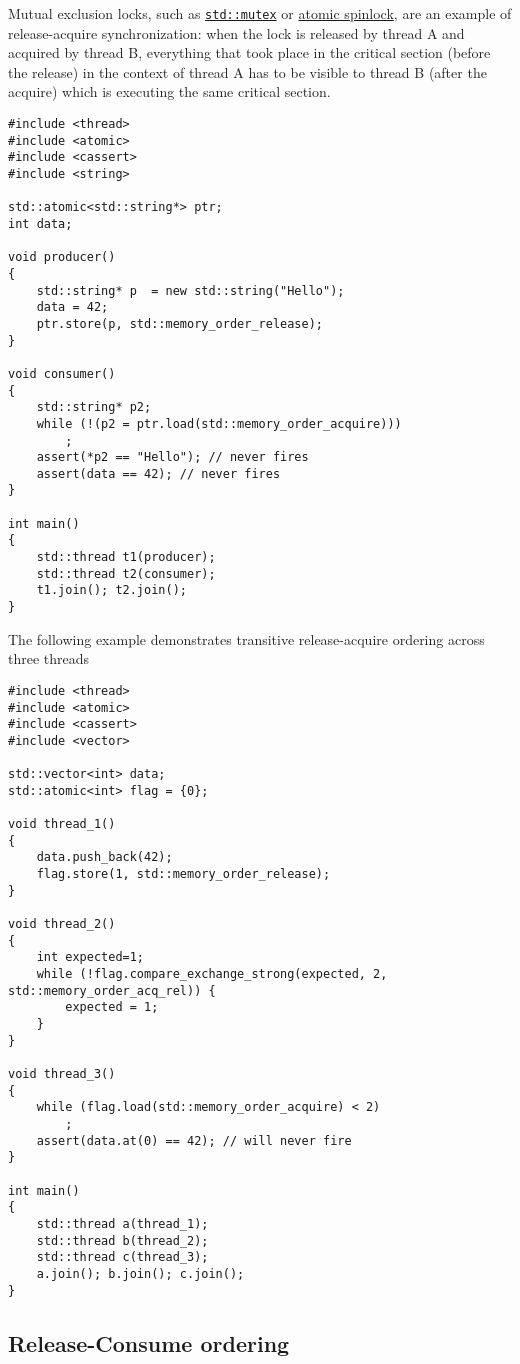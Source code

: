 \documentclass[a4paper,12pt,notitlepage,twoside,openright]{article}
\begin{document}
Mutual exclusion locks, such as
\href{https://en.cppreference.com/w/cpp/thread/mutex}{\texttt{std::mutex}} or
\href{https://en.cppreference.com/w/cpp/atomic/atomic_flag}{atomic
spinlock}, are an example of release-acquire synchronization: when the
lock is released by thread A and acquired by thread B, everything that
took place in the critical section (before the release) in the context
of thread A has to be visible to thread B (after the acquire) which is
executing the same critical section.

\begin{verbatim}
#include <thread>
#include <atomic>
#include <cassert>
#include <string>

std::atomic<std::string*> ptr;
int data;

void producer()
{
    std::string* p  = new std::string("Hello");
    data = 42;
    ptr.store(p, std::memory_order_release);
}

void consumer()
{
    std::string* p2;
    while (!(p2 = ptr.load(std::memory_order_acquire)))
        ;
    assert(*p2 == "Hello"); // never fires
    assert(data == 42); // never fires
}

int main()
{
    std::thread t1(producer);
    std::thread t2(consumer);
    t1.join(); t2.join();
}
\end{verbatim}

The following example demonstrates transitive release-acquire ordering
across three threads

\begin{verbatim}
#include <thread>
#include <atomic>
#include <cassert>
#include <vector>

std::vector<int> data;
std::atomic<int> flag = {0};

void thread_1()
{
    data.push_back(42);
    flag.store(1, std::memory_order_release);
}

void thread_2()
{
    int expected=1;
    while (!flag.compare_exchange_strong(expected, 2, std::memory_order_acq_rel)) {
        expected = 1;
    }
}

void thread_3()
{
    while (flag.load(std::memory_order_acquire) < 2)
        ;
    assert(data.at(0) == 42); // will never fire
}

int main()
{
    std::thread a(thread_1);
    std::thread b(thread_2);
    std::thread c(thread_3);
    a.join(); b.join(); c.join();
}
\end{verbatim}

\hypertarget{release-consume-ordering}{%
\subsection{Release-Consume ordering}\label{release-consume-ordering}}
\end{document}
